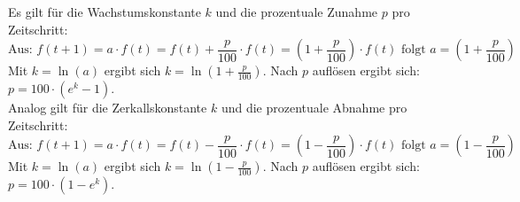 Es gilt für die Wachstumskonstante $k$ und die prozentuale Zunahme $p$ pro Zeitschritt: $$\text{Aus: } f(t+1) = a \cdot f(t) = f(t) + \frac{p}{100} \cdot f(t) = \left(1 + \frac{p}{100}\right) \cdot f(t) \text{ folgt } a = \left(1 + \frac{p}{100}\right)$$
Mit $k = \ln{(a)}$ ergibt sich $k = \ln{\left(1 + \frac{p}{100}\right)}$. Nach $p$ auflösen ergibt sich: $p = 100 \cdot \left(e^k - 1\right)$. \\

Analog gilt für die Zerkallskonstante $k$ und die prozentuale Abnahme pro Zeitschritt: $$\text{Aus: } f(t+1) = a \cdot f(t) = f(t) - \frac{p}{100} \cdot f(t) = \left(1 - \frac{p}{100}\right) \cdot f(t) \text{ folgt } a = \left(1 - \frac{p}{100}\right)$$
Mit $k = \ln{(a)}$ ergibt sich $k = \ln{\left(1 - \frac{p}{100}\right)}$. Nach $p$ auflösen ergibt sich: $p = 100 \cdot \left(1 - e^k\right)$.
